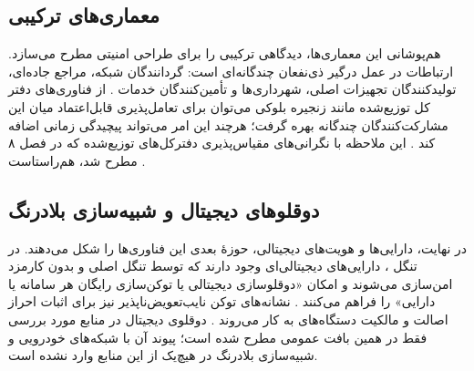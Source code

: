 \subsection{معماری‌های ترکیبی}
هم‌پوشانی این معماری‌ها، دیدگاهی ترکیبی را برای طراحی امنیتی مطرح می‌سازد. ارتباطات  در عمل درگیر ذی‌نفعان چندگانه‌ای است: گردانندگان شبکه، مراجع جاده‌ای، تولیدکنندگان تجهیزات اصلی، شهرداری‌ها و تأمین‌کنندگان خدمات \cite{farsimadanReviewSecurityChallenges2025}. از فناوری‌های دفتر کل توزیع‌شده مانند زنجیره بلوکی می‌توان برای تعامل‌پذیری قابل‌اعتماد میان این مشارکت‌کنندگان چندگانه بهره گرفت؛ هرچند این امر می‌تواند پیچیدگی زمانی اضافه کند \cite{farsimadanReviewSecurityChallenges2025}. این ملاحظه با نگرانی‌های مقیاس‌پذیری دفترکل‌های توزیع‌شده که در فصل ۸ مطرح شد، هم‌راستاست \cite{farsimadanReviewSecurityChallenges2025}.

\subsection{دوقلوهای دیجیتال و شبیه‌سازی بلادرنگ}
در نهایت، دارایی‌ها و هویت‌های دیجیتالی، حوزهٔ بعدی این فناوری‌ها را شکل می‌دهند. در تنگل ، دارایی‌های دیجیتالی‌ای وجود دارند که توسط تنگل اصلی و بدون کارمزد امن‌سازی می‌شوند و امکان «دوقلوسازی دیجیتالی یا توکن‌سازی رایگان هر سامانه یا دارایی» را فراهم می‌کنند \cite{sealeyIOTATangle202022}. نشانه‌های توکن نایب‌تعویض‌ناپذیر نیز برای اثبات احراز اصالت و مالکیت دستگاه‌های  به کار می‌روند \cite{sealeyIOTATangle202022}. دوقلوی دیجیتال در منابع مورد بررسی فقط در همین بافت عمومی  مطرح شده است؛ پیوند آن با شبکه‌های خودرویی و شبیه‌سازی بلادرنگ در هیچ‌یک از این منابع وارد نشده است.
